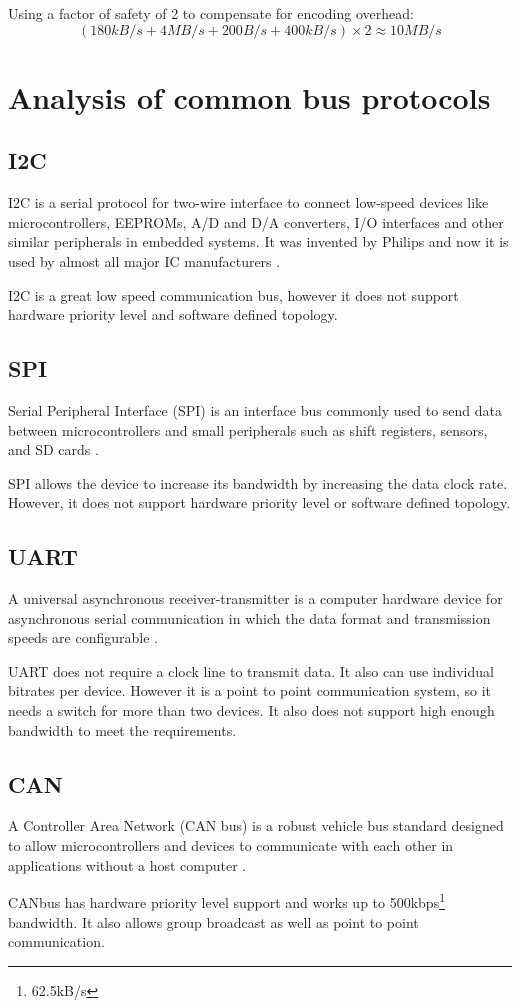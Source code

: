 \documentclass[12pt,article]{memoir}
\begin{document}
Using a factor of safety of 2 to compensate for encoding overhead:
\begin{equation}
	(180kB/s + 4MB/s + 200B/s + 400kB/s) \times 2 \approx 10MB/s
\end{equation}

\newpage

\chapter{Analysis of common bus protocols}
\section{I2C}
I2C is a serial protocol for two-wire interface to connect low-speed devices like microcontrollers, EEPROMs, A/D and D/A converters, I/O interfaces and other similar peripherals in embedded systems. It was invented by Philips and now it is used by almost all major IC manufacturers \cite{blog:I2C}.\par
I2C is a great low speed communication bus, however it does not support hardware priority level and software defined topology.

\section{SPI}
Serial Peripheral Interface (SPI) is an interface bus commonly used to send data between microcontrollers and small peripherals such as shift registers, sensors, and SD cards \cite{blog:SPI}.\par
SPI allows the device to increase its bandwidth by increasing the data clock rate. However, it does not support hardware priority level or software defined topology.

\section{UART}
A universal asynchronous receiver-transmitter is a computer hardware device for asynchronous serial communication in which the data format and transmission speeds are configurable \cite{blog:UART}.\par
UART does not require a clock line to transmit data. It also can use individual bitrates per device. However it is a point to point communication system, so it needs a switch for more than two devices. It also does not support high enough bandwidth to meet the requirements.

\section{CAN}
A Controller Area Network (CAN bus) is a robust vehicle bus standard designed to allow microcontrollers and devices to communicate with each other in applications without a host computer \cite{canbus:CAN}.\par
CANbus has hardware priority level support and works up to 500kbps\footnote{62.5kB/s} bandwidth. It also allows group broadcast as well as point to point communication.
\end{document}

